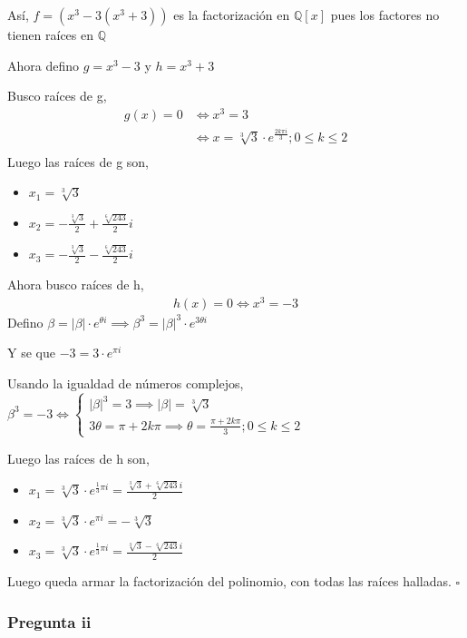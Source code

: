 Así, $ f = (x^3 - 3 (x^3 + 3)) $ es la factorización en $ \mathbb{Q}[x] $ pues los factores no tienen raíces en $ \mathbb{Q} $

Ahora defino $ g = x^3 - 3 $ y $ h = x^3 + 3 $

Busco raíces de g,
\begin{align*}
    g(x) = 0 &\iff x^3 = 3 \\
    &\iff x = \sqrt[3]{3} \cdot e^{\frac{2k\pi i}{3}}; 0\leq k \leq 2 \\
\end{align*}
Luego las raíces de g son,
\begin{itemize}
    \item $ x_1 = \sqrt[3]{3} $
    \item $ x_2 = -\frac{\sqrt[3]{3}}{2} + \frac{\sqrt[6]{243}}{2}i $
    \item $ x_3 = -\frac{\sqrt[3]{3}}{2} - \frac{\sqrt[6]{243}}{2}i $
\end{itemize}

Ahora busco raíces de h,
\begin{align*}
    h(x) = 0 \iff x^3 = -3 
\end{align*}
Defino $ \beta = |\beta|\cdot e^{\theta i} \implies \beta^3 = |\beta|^3 \cdot e^{3\theta i} $

Y se que $ -3 = 3\cdot e^{\pi i} $

Usando la igualdad de números complejos,
$ \beta^3 = -3 \iff \begin{cases}
    |\beta|^3 = 3 \implies |\beta| = \sqrt[3]{3} \\
    3\theta = \pi + 2k\pi \implies \theta = \frac{\pi +2k\pi}{3}; 0\leq k \leq 2
\end{cases} $

Luego las raíces de h son,
\begin{itemize}
    \item $ x_1 = \sqrt[3]{3}\cdot e^{\frac{1}{3}\pi i} = \frac{\sqrt[3]{3} + \sqrt[6]{243}i}{2} $
    \item $ x_2 = \sqrt[3]{3}\cdot e^{\pi i} = -\sqrt[3]{3} $
    \item $ x_3 = \sqrt[3]{3}\cdot e^{\frac{1}{3}\pi i} = \frac{\sqrt[3]{3} - \sqrt[6]{243}i}{2} $
\end{itemize}

Luego queda armar la factorización del polinomio, con todas las raíces halladas. $\square$

\subsubsection{Pregunta ii}

